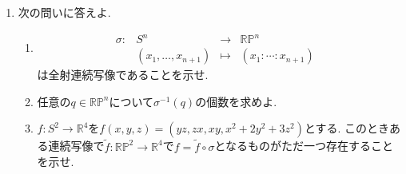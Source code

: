\documentclass[dvipdfmx,a4paper,11pt]{article}
\newcommand{\R}{\mathbb{R}}
\newcommand{\Z}{\mathbb{Z}}
\theoremstyle{definition}
\begin{document}
\begin{enumerate}[ label=\textbf{問}\ref*{sec-quot}.\arabic*]
\item \label{emb}次の問いに答えよ.	
	\begin{enumerate}
		\setlength{\parskip}{0cm} 
  \setlength{\itemsep}{0pt} 
	\item 
$$
\begin{array}{ccccc}
\sigma: &S^{n}& \rightarrow & \R\mathbb{P}^{n}& \\
&(x_{1}, \ldots, x_{n+1}) & \longmapsto & 
(x_{1}: \cdots : x_{n+1})&
\end{array}
$$
は全射連続写像であることを示せ.
	\item 任意の$q \in \R\mathbb{P}^{n}$について$\sigma^{-1}(q)$の個数を求めよ.
	\item $f : S^2 \rightarrow \R^4$を$f(x,y,z)=(yz,zx,xy, x^2+2y^2 + 3z^2)$とする.  このときある連続写像で$\widetilde{f}: \R\mathbb{P}^{2} \rightarrow \R^4$で$f =\widetilde{f} \circ  \sigma$となるものがただ一つ存在することを示せ. 

	\end{enumerate}

	

\end{enumerate}
\end{document}
